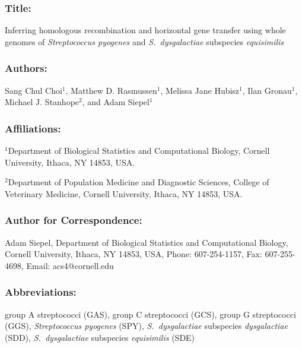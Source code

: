 \documentclass[english]{article}
\newcommand{\lyxaddress}[1]{
\par {\raggedright #1
\vspace{1.4em}
\noindent\par}
}
\begin{document}
\renewcommand\refname{Literature Cited}

\raggedright 


\subsubsection*{Title: }

Inferring homologous recombination and horizontal gene transfer 
using whole genomes of \textit{Streptococcus pyogenes} 
and\textit{ S.\ dysgalactiae} subspecies \textit{equisimilis} 


\subsubsection*{Authors:}

Sang Chul Choi$^{1}$, Matthew D. Rasmussen$^{1}$, Melissa Jane Hubisz$^{1}$, Ilan 
Gronau$^{1}$,
Michael J. Stanhope$^{2}$, and Adam Siepel$^{1}$


\subsubsection*{Affiliations:}


\lyxaddress{$^{1}$Department of Biological Statistics and Computational Biology,
Cornell University, Ithaca, NY 14853, USA.}


\lyxaddress{$^{2}$Department of Population Medicine and Diagnostic Sciences,
College of Veterinary Medicine, Cornell University, Ithaca, NY 14853,
USA.}


\subsubsection*{Author for Correspondence:}

Adam Siepel, Department of Biological Statistics and Computational
Biology, Cornell University, Ithaca, NY 14853, USA, Phone: 607-254-1157,
Fax: 607-255-4698, Email: acs4@cornell.edu\clearpage{}


\subsubsection*{Abbreviations:}

group A streptococci (GAS), group C streptococci (GCS), group G streptococci
(GGS), \textit{Streptococcus pyogenes} (SPY), \textit{S.\ dysgalactiae}
subspecies \textit{dysgalactiae} (SDD), \textit{S.\ dysgalactiae} subspecies
\textit{equisimilis} (SDE)
\end{document}
